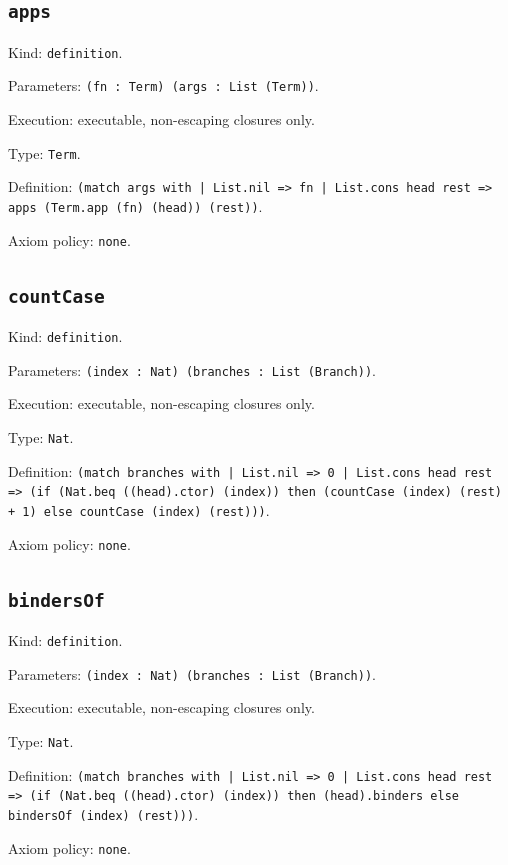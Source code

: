 \documentclass[11pt]{article}
\begin{document}
\subsection*{\texttt{apps}}
\noindent Kind: \texttt{definition}.\par
\noindent Parameters: \texttt{(fn : Term) (args : List (Term))}.\par
\noindent Execution: executable, non-escaping closures only.\par
\noindent Type: \texttt{Term}.\par
\noindent Definition: \texttt{(match args with | List.nil => fn | List.cons head rest => apps (Term.app (fn) (head)) (rest))}.\par
\noindent Axiom policy: \texttt{none}.\par
\subsection*{\texttt{countCase}}
\noindent Kind: \texttt{definition}.\par
\noindent Parameters: \texttt{(index : Nat) (branches : List (Branch))}.\par
\noindent Execution: executable, non-escaping closures only.\par
\noindent Type: \texttt{Nat}.\par
\noindent Definition: \texttt{(match branches with | List.nil => 0 | List.cons head rest => (if (Nat.beq ((head).ctor) (index)) then (countCase (index) (rest) + 1) else countCase (index) (rest)))}.\par
\noindent Axiom policy: \texttt{none}.\par
\subsection*{\texttt{bindersOf}}
\noindent Kind: \texttt{definition}.\par
\noindent Parameters: \texttt{(index : Nat) (branches : List (Branch))}.\par
\noindent Execution: executable, non-escaping closures only.\par
\noindent Type: \texttt{Nat}.\par
\noindent Definition: \texttt{(match branches with | List.nil => 0 | List.cons head rest => (if (Nat.beq ((head).ctor) (index)) then (head).binders else bindersOf (index) (rest)))}.\par
\noindent Axiom policy: \texttt{none}.\par
\end{document}
